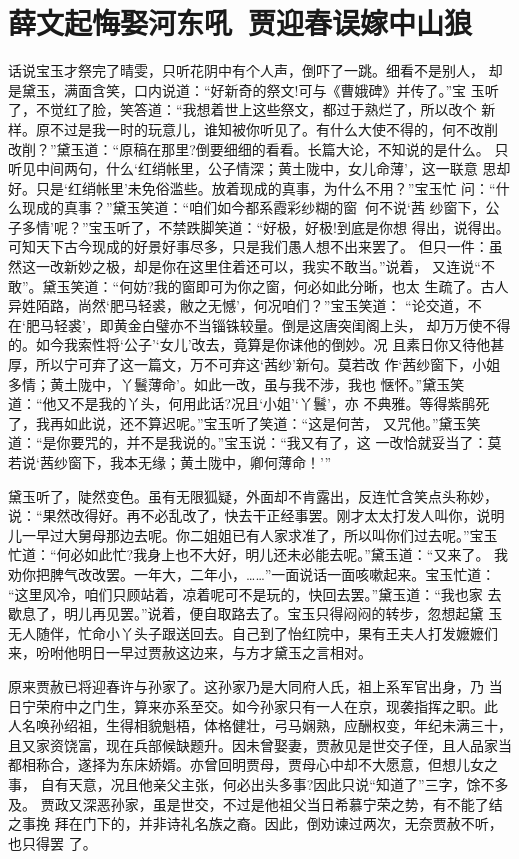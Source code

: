 \chapter{薛文起悔娶河东吼~贾迎春误嫁中山狼}

话说宝玉才祭完了晴雯，只听花阴中有个人声，倒吓了一跳。细看不是别人，
却是黛玉，满面含笑，口内说道：“好新奇的祭文!可与《曹娥碑》并传了。”宝
玉听了，不觉红了脸，笑答道：“我想着世上这些祭文，都过于熟烂了，所以改个
新样。原不过是我一时的玩意儿，谁知被你听见了。有什么大使不得的，何不改削
改削？”黛玉道：“原稿在那里?倒要细细的看看。长篇大论，不知说的是什么。
只听见中间两句，什么‘红绡帐里，公子情深；黄土陇中，女儿命薄’，这一联意
思却好。只是‘红绡帐里’未免俗滥些。放着现成的真事，为什么不用？”宝玉忙
问：“什么现成的真事？”黛玉笑道：“咱们如今都系霞彩纱糊的窗，何不说‘茜
纱窗下，公子多情’呢？”宝玉听了，不禁跌脚笑道：“好极，好极!到底是你想
得出，说得出。可知天下古今现成的好景好事尽多，只是我们愚人想不出来罢了。
但只一件：虽然这一改新妙之极，却是你在这里住着还可以，我实不敢当。”说着，
又连说“不敢”。黛玉笑道：“何妨?我的窗即可为你之窗，何必如此分晰，也太
生疏了。古人异姓陌路，尚然‘肥马轻裘，敝之无憾’，何况咱们？”宝玉笑道：
“论交道，不在‘肥马轻裘’，即黄金白璧亦不当锱铢较量。倒是这唐突闺阁上头，
却万万使不得的。如今我索性将‘公子’‘女儿’改去，竟算是你诔他的倒妙。况
且素日你又待他甚厚，所以宁可弃了这一篇文，万不可弃这‘茜纱’新句。莫若改
作‘茜纱窗下，小姐多情；黄土陇中，丫鬟薄命’。如此一改，虽与我不涉，我也
惬怀。”黛玉笑道：“他又不是我的丫头，何用此话?况且‘小姐’‘丫鬟’，亦
不典雅。等得紫鹃死了，我再如此说，还不算迟呢。”宝玉听了笑道：“这是何苦，
又咒他。”黛玉笑道：“是你要咒的，并不是我说的。”宝玉说：“我又有了，这
一改恰就妥当了：莫若说‘茜纱窗下，我本无缘；黄土陇中，卿何薄命！’”

黛玉听了，陡然变色。虽有无限狐疑，外面却不肯露出，反连忙含笑点头称妙，
说：“果然改得好。再不必乱改了，快去干正经事罢。刚才太太打发人叫你，说明
儿一早过大舅母那边去呢。你二姐姐已有人家求准了，所以叫你们过去呢。”宝玉
忙道：“何必如此忙?我身上也不大好，明儿还未必能去呢。”黛玉道：“又来了。
我劝你把脾气改改罢。一年大，二年小，……”一面说话一面咳嗽起来。宝玉忙道：
“这里风冷，咱们只顾站着，凉着呢可不是玩的，快回去罢。”黛玉道：“我也家
去歇息了，明儿再见罢。”说着，便自取路去了。宝玉只得闷闷的转步，忽想起黛
玉无人随伴，忙命小丫头子跟送回去。自己到了怡红院中，果有王夫人打发嬷嬷们
来，吩咐他明日一早过贾赦这边来，与方才黛玉之言相对。

原来贾赦已将迎春许与孙家了。这孙家乃是大同府人氏，祖上系军官出身，乃
当日宁荣府中之门生，算来亦系至交。如今孙家只有一人在京，现袭指挥之职。此
人名唤孙绍祖，生得相貌魁梧，体格健壮，弓马娴熟，应酬权变，年纪未满三十，
且又家资饶富，现在兵部候缺题升。因未曾娶妻，贾赦见是世交子侄，且人品家当
都相称合，遂择为东床娇婿。亦曾回明贾母，贾母心中却不大愿意，但想儿女之事，
自有天意，况且他亲父主张，何必出头多事?因此只说“知道了”三字，馀不多及。
贾政又深恶孙家，虽是世交，不过是他祖父当日希慕宁荣之势，有不能了结之事挽
拜在门下的，并非诗礼名族之裔。因此，倒劝谏过两次，无奈贾赦不听，也只得罢
了。


